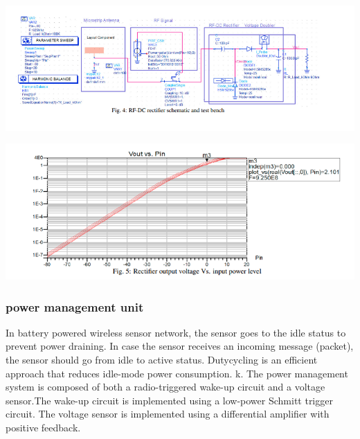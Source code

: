 \documentclass{article}
\begin{document}
\begin{center}
  \includegraphics[scale=0.5]{rf-dc.png}
  \label{fig:rfdc}
\end{center}


\begin{center}
  \includegraphics[scale=0.5]{vs.png}
  \label{fig:vs}
\end{center}


\subsubsection{ power management unit}
In battery powered wireless sensor network, the sensor goes to the idle status to prevent power draining. In case the sensor receives an incoming message (packet), the sensor should go from idle to active status. Dutycycling is an efficient approach that reduces idle-mode power consumption.
k. The power management system is composed of both a radio-triggered wake-up circuit and a voltage sensor.The wake-up circuit is implemented using a low-power Schmitt trigger circuit. The voltage sensor is implemented using a differential amplifier with positive feedback.
\end{document}
